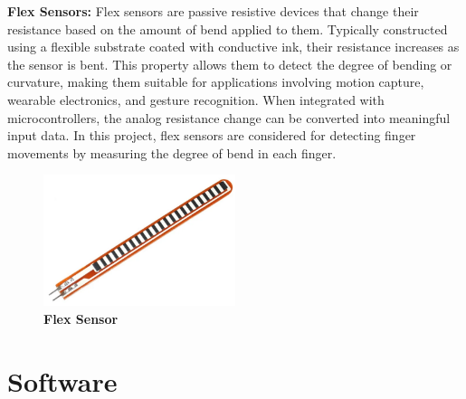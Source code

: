 \textbf{Flex Sensors: }Flex sensors are passive resistive devices that change their resistance based on the amount of bend applied to them. Typically constructed using a flexible substrate coated with conductive ink, their resistance increases as the sensor is bent. This property allows them to detect the degree of bending or curvature, making them suitable for applications involving motion capture, wearable electronics, and gesture recognition. When integrated with microcontrollers, the analog resistance change can be converted into meaningful input data. In this project, flex sensors are considered for detecting finger movements by measuring the degree of bend in each finger.

\begin{figure}[htbp!]
\centering
\includegraphics[width=0.5\textwidth]{images/3.4.png}
\caption{\textbf{Flex Sensor}}
\label{fig:3.4}
\end{figure}


\section{Software}
\lipsum[4-8]
